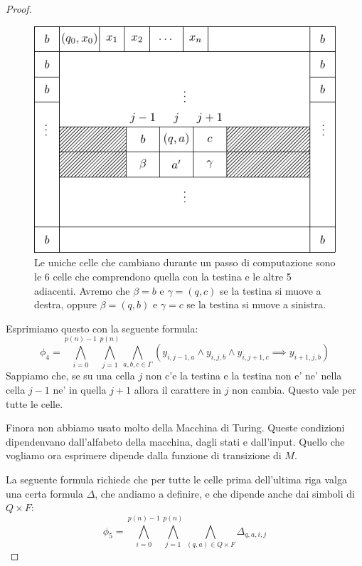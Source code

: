 \begin{proof}
    \begin{figure}[h]
        \begin{center}
            \includegraphics{./img/NPClass/SATproof3.pdf}
            \caption{Le uniche celle che cambiano durante un passo di computazione sono le 6 celle
                che comprendono quella con la testina e le altre 5 adiacenti. Avremo che $\beta = b$ e
                $\gamma = (q,c)$ se la testina si muove a destra, oppure $\beta = (q,b)$ e $\gamma = c$
            se la testina si muove a sinistra.}
        \end{center}
    \end{figure}

    Esprimiamo questo con la seguente formula:
    \begin{equation*}
        \phi_{4} = \bigwedge_{i=0}^{p(n)-1}\bigwedge_{j=1}^{p(n)}\bigwedge_{a,b,c\in \Gamma}
        (y_{i,j-1,a} \land y_{i,j,b} \land y_{i,j+1,c} \implies y_{i+1,j,b})
    \end{equation*}
    Sappiamo che, se su una cella $j$ non c'e la testina e la testina non e' ne' nella cella $j-1$
    ne' in quella $j+1$ allora il carattere in $j$ non cambia.  Questo vale per tutte le celle.

    Finora non abbiamo usato molto della Macchina di Turing. Queste condizioni dipendenvano
    dall'alfabeto della macchina, dagli stati e dall'input. Quello che vogliamo ora esprimere
    dipende dalla funzione di transizione di $M$.

    La seguente formula richiede che per tutte le celle prima dell'ultima riga valga una certa
    formula $\Delta$, che andiamo a definire, e che dipende anche dai simboli di $Q \times F$:
    \begin{equation*}
        \phi_{5} = \bigwedge_{i=0}^{p(n)-1}\bigwedge_{j=1}^{p(n)}\bigwedge_{(q,a)\in Q\times F}
        \Delta_{q,a,i,j}
    \end{equation*}


\end{proof}
